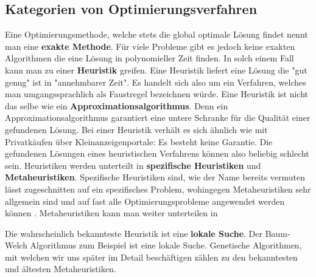 \subsection*{Kategorien von Optimierungsverfahren}
Eine Optimierungsmethode, welche stets die global optimale Lösung findet nennt man eine \textbf{exakte Methode}. Für viele Probleme gibt es jedoch keine exakten Algorithmen die eine Lösung in polynomieller Zeit finden. In solch einem Fall kann man zu einer \textbf{Heuristik} greifen. Eine Heuristik liefert eine Lösung die "gut genug" ist in "annehmbarer Zeit". Es handelt sich also um ein Verfahren, welches man umgangssprachlich als Faustregel bezeichnen würde. Eine Heuristik ist nicht das selbe wie ein \textbf{Approximationsalgorithmus}. Denn ein Approximationsalgorithmus garantiert eine untere Schranke für die Qualität einer gefundenen Lösung. Bei einer Heuristik verhält es sich ähnlich wie mit Privatkäufen über Kleinanzeigenportale: Es besteht keine Garantie. Die gefundenen Lösungen eines heuristischen Verfahrens können also beliebig schlecht sein. Heuristiken werden unterteilt in \textbf{spezifische Heuristiken} und \textbf{Metaheuristiken}. Spezifische Heuristiken sind, wie der Name bereits vermuten lässt zugeschnitten auf ein spezifisches Problem, wohingegen Metaheuristiken sehr allgemein sind und auf fast alle Optimierungsprobleme angewendet werden können \cite*{MetaheuristicsEGT}. Metaheuristiken kann man weiter unterteilen in 

Die wahrscheinlich bekannteste Heuristik ist eine \textbf{lokale Suche}. Der Baum-Welch Algorithmus zum Beispiel ist eine lokale Suche. Genetische Algorithmen, mit welchen wir uns später im Detail beschäftigen zählen zu den bekanntesten und ältesten Metaheuristiken.

